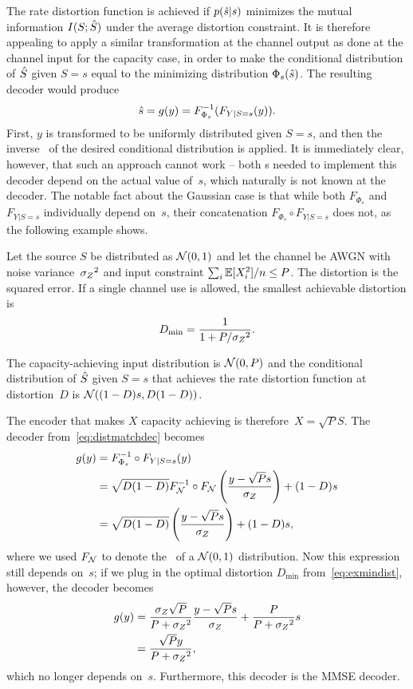 The rate distortion function is achieved if $p({\hat{s}}|s)$ minimizes the mutual
information $I(S;{\hat{S}})$ under the average distortion constraint. It is therefore
appealing to apply a similar transformation at the channel output as done at the
channel input for the capacity case, in order to make the conditional
distribution of ${\hat{S}}$ given $S=s$ equal to the minimizing distribution
$\Phi_s({\hat{s}})$. The resulting decoder would produce
\begin{equation}
  \label{eq:distmatchdec}
  {\hat{s}} = g(y) = F_{\Phi_s}^{-1}(F_{Y|S=s}(y)).
\end{equation}
First, $y$ is transformed to be uniformly distributed given $S=s$, and then the
inverse \cdf\ of the desired conditional distribution is applied. It is
immediately clear, however, that such an approach cannot work -- both \cdf s
needed to implement this decoder depend on the actual value of~$s$, which
naturally is not known at the decoder. The notable fact about the Gaussian
case is that while both $F_{\Phi_s}$ and $F_{Y|S=s}$ individually depend on~$s$,
their concatenation $F_{\Phi_s} \circ F_{Y|S=s}$ does not, as the following
example shows. 

\begin{example}
  Let the source $S$ be distributed as $\mathcal{N}(0,1)$ and let the channel be AWGN
  with noise variance~${{\sigma_Z}^2}$ and input constraint $\sum_i \mathbb{E}[X_i^2]/n \le P$.
  The distortion is the squared error. If a single channel use is allowed,  the
  smallest achievable distortion is
  \begin{equation}
    \label{eq:exmindist}
    D_{\min} = \frac{1}{1 + P/{{\sigma_Z}^2}}.
  \end{equation}
\end{example}
The capacity-achieving input distribution is $\mathcal{N}(0,P)$ and the conditional
distribution of ${\hat{S}}$ given $S=s$ that achieves the rate distortion function at
distortion~$D$ is $\mathcal{N}((1-D)s, D(1-D))$.

The encoder that makes $X$ capacity achieving is therefore~$X = \sqrt{P}S$. The
decoder from~\eqref{eq:distmatchdec} becomes
\begin{align*}
  g(y) &= F_{\Phi_s}^{-1} \circ F_{Y|S=s}(y) \\
  &= \sqrt{D(1-D)} F_{\mathcal{N}}^{-1} \circ F_{\mathcal{N}}\left( \frac{y-\sqrt{P}s}{{\sigma_Z}}
  \right) + (1-D)s \\
  &= \sqrt{D(1-D)} \left( \frac{y-\sqrt{P}s}{{\sigma_Z}} \right) + (1-D)s,
\end{align*}
where we used $F_{\mathcal{N}}$ to denote the \cdf\ of a $\mathcal{N}(0,1)$ distribution. Now this
expression still depends on~$s$; if we plug in the optimal distortion $D_{\min}$
from~\eqref{eq:exmindist}, however, the decoder becomes
\begin{align*}
  g(y) &= \frac{{\sigma_Z} \sqrt{P}}{P+{{\sigma_Z}^2}} \frac{y - \sqrt{P}s}{{\sigma_Z}} + \frac{P}{P +
  {{\sigma_Z}^2}}s \\ 
  &= \frac{\sqrt{P}y}{P + {{\sigma_Z}^2}},
\end{align*}
which no longer depends on~$s$. Furthermore, this decoder is the MMSE decoder.


